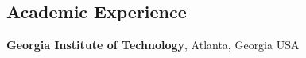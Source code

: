 \documentclass[margin,line]{res}
\newenvironment{list2}{
  \begin{list}{$\bullet$}{%
      \setlength{\itemsep}{0in}
      \setlength{\parsep}{0in} \setlength{\parskip}{0in}
      \setlength{\topsep}{0in} \setlength{\partopsep}{0in} 
      \setlength{\leftmargin}{0.2in}}}{\end{list}}
\begin{document}
\begin{resume}
\begin{comment}
\section{\sc Standardized Tests}
\begin{list2}
\item GRE General: 322 (V152, Q170, W3.5) \hfill { Dec. 6, 2015}
\item GRE Subject (Mathematics): 910 (99\% Below) \hfill { Apr. 16, 2016}
\item TOEFL iBT: 109 (R29, L29, S24, W27) \hfill { Apr. 22, 2016}
\end{list2}
\end{comment}

\section{\sc Academic Experience}







{\bf Georgia Institute of Technology}, Atlanta, Georgia USA



\end{resume}
\end{document}

